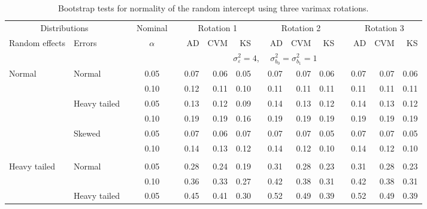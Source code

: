 \documentclass{article} %
\begin{document}
\begin{table}[ht]
\begin{scriptsize}
\begin{center}
\begin{tabular}{ll p{.1cm} c p{.1cm} rrr p{.1cm} rrr p{.1cm} rrr}
   \hline
\end{tabular}
\end{center}
\end{scriptsize}
\end{table}

\begin{table}[ht]
\caption{Bootstrap tests for normality of the random intercept using three varimax rotations.}
\begin{scriptsize}
\begin{center}
\begin{tabular}{ll p{.1cm} c p{.1cm} rrr p{.1cm} rrr p{.1cm} rrr}
  \hline
  \multicolumn{2}{c}{Distributions}& & Nominal & &  \multicolumn{3}{c}{Rotation 1} & & \multicolumn{3}{c}{Rotation 2} & & \multicolumn{3}{c}{Rotation 3}\\ \cline{1-2} \cline{6-8} \cline{10-12} \cline{14-16}
  Random effects & Errors & & $\alpha$ & & AD & CVM & KS & & AD & CVM & KS & & AD & CVM & KS \\ 
   \hline
& && && \multicolumn{9}{c}{$\sigma_{\varepsilon}^2 = 4$, \ \ $\sigma_{b_0}^2 = \sigma_{b_1}^2 = 1$} \\ \cline{6-16}
\rowcolor{gray!20}Normal       & Normal       && 0.05 &&   0.07 & 0.06 & 0.05 && 0.07 & 0.07 & 0.06 && 0.07 & 0.07 & 0.06 \\ 
\rowcolor{gray!20}             &              && 0.10 &&   0.12 & 0.11 & 0.10 && 0.11 & 0.11 & 0.11 && 0.11 & 0.11 & 0.11 \\ 
\rowcolor{gray!20}             & Heavy tailed && 0.05 &&   0.13 & 0.12 & 0.09 && 0.14 & 0.13 & 0.12 && 0.14 & 0.13 & 0.12 \\ 
\rowcolor{gray!20}             &              && 0.10 &&   0.19 & 0.19 & 0.16 && 0.19 & 0.19 & 0.19 && 0.19 & 0.19 & 0.19 \\ 
\rowcolor{gray!20}             & Skewed       && 0.05 &&   0.07 & 0.06 & 0.07 && 0.07 & 0.07 & 0.05 && 0.07 & 0.07 & 0.05 \\ 
\rowcolor{gray!20}             &              && 0.10 &&   0.14 & 0.13 & 0.12 && 0.14 & 0.12 & 0.10 && 0.14 & 0.12 & 0.10 \\ 
             &&&&&&&&&&&&&&&\\
Heavy tailed & Normal       && 0.05 &&   0.28 & 0.24 & 0.19 && 0.31 & 0.28 & 0.23 && 0.31 & 0.28 & 0.23 \\ 
             &              && 0.10 &&   0.36 & 0.33 & 0.27 && 0.42 & 0.38 & 0.31 && 0.42 & 0.38 & 0.31 \\ 
             & Heavy tailed && 0.05 &&   0.45 & 0.41 & 0.30 && 0.52 & 0.49 & 0.39 && 0.52 & 0.49 & 0.39 \\ 

\end{tabular}
\end{center}
\end{scriptsize}
\end{table}
\end{document}
